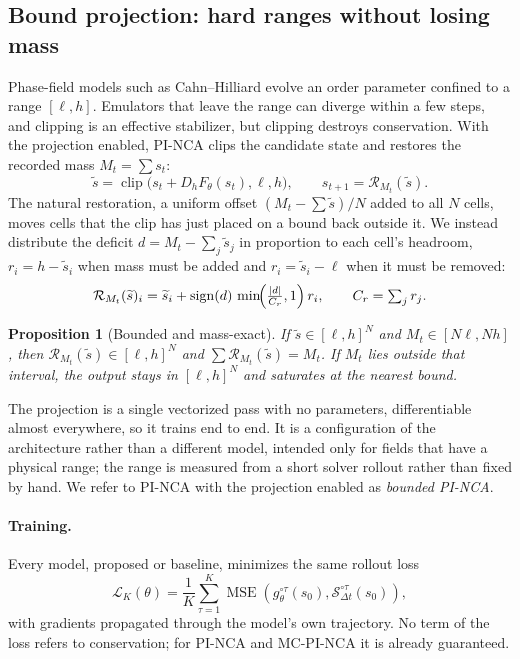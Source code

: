 \documentclass{article}
\newtheorem{proposition}{Proposition}
\begin{document}
\subsection{Bound projection: hard ranges without losing mass}
Phase-field models such as Cahn--Hilliard evolve an order parameter confined to a range
$[\ell,h]$. Emulators that leave the range can diverge within a few steps, and clipping is
an effective stabilizer, but clipping destroys conservation. With the projection enabled,
PI-NCA clips the candidate state and restores the recorded mass $M_t=\sum s_t$:
\begin{equation}
 \widetilde s=\operatorname{clip}\bigl(s_t+D_hF_\theta(s_t),\ell,h\bigr),
 \qquad s_{t+1}=\mathcal{R}_{M_t}(\widetilde s).
\label{eq:bounded}
\end{equation}
The natural restoration, a uniform offset $(M_t-\sum\widetilde s)/N$ added to all $N$
cells, moves cells that the clip has just placed on a bound back outside it. We instead
distribute the deficit $d=M_t-\sum_j\widetilde s_j$ in proportion to each cell's headroom,
$r_i=h-\widetilde s_i$ when mass must be added and $r_i=\widetilde s_i-\ell$ when it must
be removed:
\begin{equation}
 \mathcal{R}_{M_t}(\widetilde s)_i=\widetilde s_i
 +\operatorname{sign}(d)\,\min\!\Bigl(\tfrac{|d|}{C_r},1\Bigr)\,r_i,
 \qquad C_r=\textstyle\sum_j r_j.
\label{eq:headroom}
\end{equation}

\begin{proposition}[Bounded and mass-exact]
\label{prop:headroom}
If $\widetilde s\in[\ell,h]^N$ and $M_t\in[N\ell,Nh]$, then
$\mathcal{R}_{M_t}(\widetilde s)\in[\ell,h]^N$ and $\sum\mathcal{R}_{M_t}(\widetilde s)=M_t$.
If $M_t$ lies outside that interval, the output stays in $[\ell,h]^N$ and saturates at
the nearest bound.
\end{proposition}
The projection is a single vectorized pass with no parameters, differentiable almost
everywhere, so it trains end to end. It is a configuration of the architecture rather than
a different model, intended only for fields that have a physical range; the range is
measured from a short solver rollout rather than fixed by hand. We refer to PI-NCA with
the projection enabled as \emph{bounded PI-NCA}.

\paragraph{Training.} Every model, proposed or baseline, minimizes the same rollout loss
\begin{equation}
\mathcal{L}_K(\theta)=\frac{1}{K}\sum_{\tau=1}^{K}
\operatorname{MSE}\!\left(g_\theta^{\circ\tau}(s_0),
\mathcal{S}_{\Delta t}^{\circ\tau}(s_0)\right),
\label{eq:training}
\end{equation}
with gradients propagated through the model's own trajectory. No term of the loss refers
to conservation; for PI-NCA and MC-PI-NCA it is already guaranteed.
\end{document}
